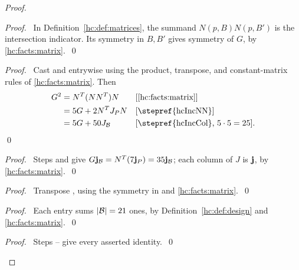 \begin{mergedproofsection}
\begin{proof}
 \begin{proof}\pf\ In Definition~\ref{hc:def:matrices}, the summand
  $N(p,B)N(p,B')$ is the intersection indicator. Its symmetry in
  $B,B'$ gives symmetry of $G$, by \ref{hc:facts:matrix}.~\qed\end{proof}
 \begin{proof}
  \pf\ Cast  and  entrywise
  using the product, transpose, and constant-matrix rules of
  \ref{hc:facts:matrix}. Then
  \begin{align*}
   G^2&=N^T(NN^T)N &&\text{[\ref{hc:facts:matrix}]}\\
      &=5G+2N^TJ_PN &&\text{[\stepref{hcIncNN}]}\\
      &=5G+50J_{\cB} &&\text{[\stepref{hcIncCol}, $5\cdot5=25$].}
  \end{align*}\qed
 \end{proof}
 \begin{proof}\pf\ Steps  and 
  give $G{\mathbf j}_{{\mathcal B}}=N^T(7{\mathbf j}_P)=35{\mathbf j}_{{\mathcal B}}$;
  each column of $J$ is ${\mathbf j}$, by \ref{hc:facts:matrix}.~\qed\end{proof}
 \begin{proof}\pf\ Transpose , using the symmetry
  in  and \ref{hc:facts:matrix}.~\qed\end{proof}
 \begin{proof}\pf\ Each entry sums $|{\mathcal B}|=21$ ones, by
  Definition~\ref{hc:def:design} and \ref{hc:facts:matrix}.~\qed\end{proof}
 \qedstep
 \begin{proof}\pf\ Steps --
  give every asserted identity.~\qed\end{proof}
\end{proof}


\end{mergedproofsection}
